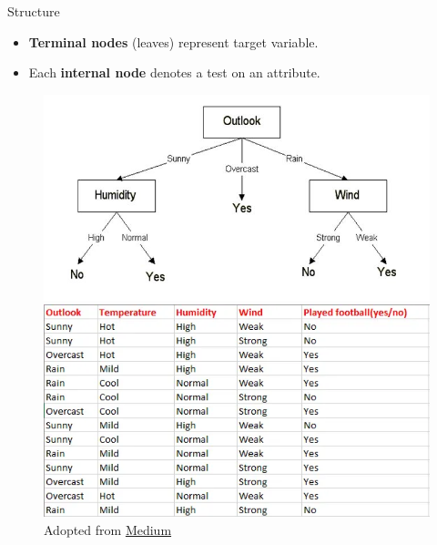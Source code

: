 \documentclass[serif, aspectratio=169]{beamer}
\begin{document}
\begin{frame}{Structure}
    \begin{itemize}
        \itemsep1em
        \justifying
        \item \textbf{Terminal nodes} (leaves) represent target variable.
        \item Each \textbf{internal node} denotes a test on an attribute.
    \end{itemize}
    \endminipage
    \hfill
    \begin{figure}[!htb]
        \includegraphics[width=\linewidth]{pic/dt_e.png} \\
        \includegraphics[width=0.85\linewidth]{pic/dt_edataset.png}
        {\scriptsize Adopted from \href{https://medium.datadriveninvestor.com/decision-tree-algorithm-with-hands-on-example-e6c2afb40d38}{Medium}}
    \end{figure}
    \endminipage
\end{frame}
\end{document}

